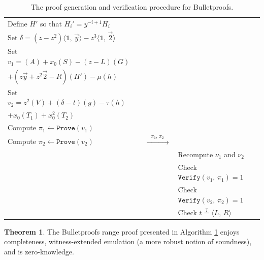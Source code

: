 \documentclass[11pt,letterpaper]{article}
\theoremstyle{definition}
\newtheorem{theorem}{Theorem}
\newcommand{\6}{\mathbf}
\newcommand{\7}{\mathcal}
\newcommand{\ip}[2]{{\langle {#1}, \, {#2} \rangle}}
\newcommand{\one}{\mathbb{1}}
\begin{document}
\begin{table}[H]
\begin{tabular}{|lcl|}
    Define $H'$ so that $H_i' = y^{-i+1} H_i$ &&\\
    Set $\delta = (z - z^2) \ip{\one}{\vec{y}} - z^3 \ip{\one}{\vec{2}}$ &&\\

    Set $v_1 = (A) + x_0 (S) - (z - L) (G) $ &&\\
    \quad \quad $+ (z \vec{y} + z^2 \vec{2} - R) (H') - \mu (h)$ &&\\

    Set $v_2 = z^2 (V) + (\delta - t) (g)  - \tau (h)$ &&\\
    \quad \quad $+ x_0 (T_1) + x_0^2 (T_2)$ &&\\



    Compute $\pi_1 \leftarrow \texttt{Prove}(v_1)$ &&\\
    Compute $\pi_2 \leftarrow \texttt{Prove}(v_2)$ & $\xrightarrow{\quad \pi_1, \, \pi_2 \quad}$ &\\

    && Recompute $\nu_1$ and $\nu_2$ \\
    && Check $\texttt{Verify}(v_1, \, \pi_1) = 1$ \\
    && Check $\texttt{Verify}(v_2, \, \pi_2) = 1$ \\
    && Check $t \stackrel{?}{=} \ip{L}{R}$ \\
    \hline
    \end{tabular}
    \smallskip
    \caption{The proof generation and verification procedure for Bulletproofs.}
    \label{alg:BPMain}
\end{table}





\begin{theorem}
    The Bulletproofs range proof presented in Algorithm \ref{alg:BPMain} enjoys completeness, witness-extended emulation (a more robust notion of soundness), and is zero-knowledge.
\end{theorem}
\end{document}
